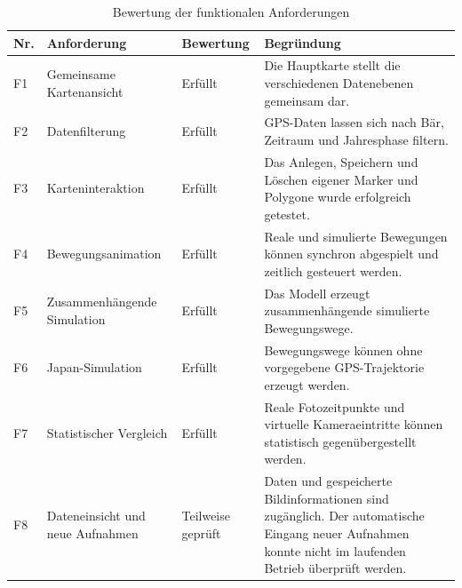 \documentclass[12pt,a4paper]{report}
\begin{document}
\begin{table}[htbp]
    \centering
    \caption{Bewertung der funktionalen Anforderungen}
    \label{tab:bewertung-funktional}
    \small
    \setlength{\tabcolsep}{4pt}
    \begin{tabular}{L{1.0cm} L{3.8cm} L{2.5cm} L{7.0cm}}
        \toprule
        \textbf{Nr.} &
        \textbf{Anforderung} &
        \textbf{Bewertung} &
        \textbf{Begründung} \\
        \midrule

        F1 &
        Gemeinsame Kartenansicht &
        Erfüllt &
        Die Hauptkarte stellt die verschiedenen
        Datenebenen gemeinsam dar. \\

        \addlinespace
        F2 &
        Datenfilterung &
        Erfüllt &
        GPS-Daten lassen sich nach Bär,
        Zeitraum und Jahresphase filtern. \\

        \addlinespace
        F3 &
        Karteninteraktion &
        Erfüllt &
        Das Anlegen, Speichern und Löschen
        eigener Marker und Polygone
        wurde erfolgreich getestet. \\

        \addlinespace
        F4 &
        Bewegungsanimation &
        Erfüllt &
        Reale und simulierte Bewegungen
        können synchron abgespielt
        und zeitlich gesteuert werden. \\

        \addlinespace
        F5 &
        Zusammenhängende Simulation &
        Erfüllt &
        Das Modell erzeugt zusammenhängende
        simulierte Bewegungswege. \\

        \addlinespace
        F6 &
        Japan-Simulation &
        Erfüllt &
        Bewegungswege können ohne
        vorgegebene GPS-Trajektorie
        erzeugt werden. \\

        \addlinespace
        F7 &
        Statistischer Vergleich &
        Erfüllt &
        Reale Fotozeitpunkte und virtuelle
        Kameraeintritte können statistisch
        gegenübergestellt werden. \\

        \addlinespace
        F8 &
        Dateneinsicht und neue Aufnahmen &
        Teilweise geprüft &
        Daten und gespeicherte
        Bildinformationen sind zugänglich.
        Der automatische Eingang neuer
        Aufnahmen konnte nicht im laufenden
        Betrieb überprüft werden. \\

        \bottomrule
    \end{tabular}
\end{table}
\end{document}
